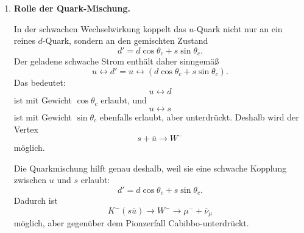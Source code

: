 \documentclass[11pt,a4paper]{scrartcl}
\newcommand{\kaonm}{K^-}
\theoremstyle{definition}
\theoremstyle{plain}
\theoremstyle{remark}
\begin{document}
\begin{enumerate}[label=(\alph*)]
    \begin{answerbox}
        Ohne Quarkmischung kann man den Zerfall
        \[
            \kaonm(s\overline u)\to\mu^-+\overline{\nu}_\mu
        \]
        mit den bisherigen Vertizes nicht darstellen, weil der benötigte Vertex
        \[
            \boxed{s+\overline u\to W^-}
        \]
        in der vereinfachten generationsdiagonalen Kopplung fehlt.
    \end{answerbox}

    \item \textbf{Rolle der Quark-Mischung.}

    \begin{calculationbox}
        In der schwachen Wechselwirkung koppelt das $u$-Quark nicht nur an ein reines $d$-Quark, sondern an den gemischten Zustand
        \[
            d'=d\cos\theta_c+s\sin\theta_c.
        \]
        Der geladene schwache Strom enthält daher sinngemäß
        \[
            u \leftrightarrow d'
            =
            u \leftrightarrow (d\cos\theta_c+s\sin\theta_c).
        \]
        Das bedeutet:
        \[
            u \leftrightarrow d
        \]
        ist mit Gewicht $\cos\theta_c$ erlaubt, und
        \[
            u \leftrightarrow s
        \]
        ist mit Gewicht $\sin\theta_c$ ebenfalls erlaubt, aber unterdrückt.
        Deshalb wird der Vertex
        \[
            s+\overline u\to W^-
        \]
        möglich.
    \end{calculationbox}

    \begin{calculationbox}[title=Diagramm f\"ur den Kaonzerfall mit Cabibbo-Mischung]
    \begin{center}
    \end{center}
    \end{calculationbox}

    \begin{answerbox}
        Die Quarkmischung hilft genau deshalb, weil sie eine schwache Kopplung zwischen $u$ und $s$ erlaubt:
        \[
            \boxed{d'=d\cos\theta_c+s\sin\theta_c.}
        \]
        Dadurch ist
        \[
            \boxed{K^-(s\overline u)\to W^-\to\mu^-+\overline\nu_\mu}
        \]
        möglich, aber gegenüber dem Pionzerfall Cabibbo-unterdrückt.
    \end{answerbox}
\end{enumerate}
\end{document}

